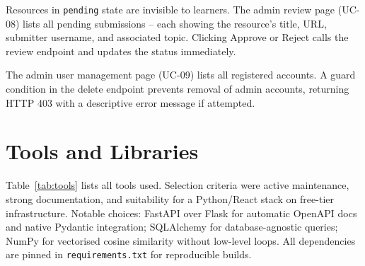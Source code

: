 \documentclass[12pt,a4paper]{report}
\begin{document}
Resources in \texttt{pending} state are invisible to learners. The admin review page (UC-08) lists all pending submissions -- each showing the resource's title, URL, submitter username, and associated topic. Clicking Approve or Reject calls the review endpoint and updates the status immediately.

The admin user management page (UC-09) lists all registered accounts. A guard condition in the delete endpoint prevents removal of admin accounts, returning HTTP 403 with a descriptive error message if attempted.

\section{Tools and Libraries}

Table~\ref{tab:tools} lists all tools used. Selection criteria were active maintenance, strong documentation, and suitability for a Python/React stack on free-tier infrastructure. Notable choices: FastAPI over Flask \cite{flask} for automatic OpenAPI docs and native Pydantic integration; SQLAlchemy for database-agnostic queries; NumPy for vectorised cosine similarity without low-level loops. All dependencies are pinned in \texttt{requirements.txt} for reproducible builds.
\end{document}
